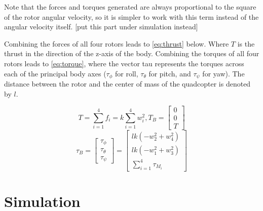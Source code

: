 \documentclass[letterpaper,12pt,titlepage,oneside,final]{book}
\begin{document}
Note that the forces and torques generated are always proportional to the square of the rotor angular velocity, so it is simpler to work with this term instead of the angular velocity itself. [put this part under simulation instead]

Combining the forces of all four rotors leads to \eqref{eq:thrust} below. Where $T$ is the thrust in the direction of the z-axis of the body. 
Combining the torques of all four rotors leads to \eqref{eq:torque}, where the vector tau represents the torques across each of the principal body axes ($\tau_{\phi}$ for roll, $\tau_{\theta}$ for pitch, and $\tau_{\psi}$ for yaw). 
The distance between the rotor and the center of mass of the quadcopter is denoted by $l$. 

\begin{equation} \label{eq:thrust}
T = \sum_{i=1}^{4} f_{i} = k\sum_{i=1}^{4} w^{2}_{i} , T_{B} = 
\begin{bmatrix}
0 \\
0 \\
T
\end{bmatrix}
\end{equation}
\begin{equation} \label{eq:torque}
\tau_{B} = 
\begin{bmatrix}
\tau_{\phi} \\
\tau_{\theta} \\
\tau_{\psi}
\end{bmatrix}
=
\begin{bmatrix}
lk(-w_{2}^{2}+w_{4}^{2}) \\
lk(-w_{1}^{2}+w_{3}^{2}) \\
\sum_{i=1}^{4}\tau_{M_{i}}
\end{bmatrix}
\end{equation}


\section{Simulation}

\end{document}
